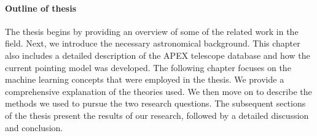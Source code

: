\paragraph{Outline of thesis}
The thesis begins by providing an overview of some of the related work in the field. Next, we introduce the necessary astronomical background.
This chapter also includes a detailed description of the APEX telescope database and how the current pointing model was developed.
The following chapter focuses on the machine learning concepts that were employed in the thesis. We provide a comprehensive explanation of the theories used.
We then move on to describe the methods we used to pursue the two research questions.
The subsequent sections of the thesis present the results of our research, followed by a detailed discussion and conclusion.